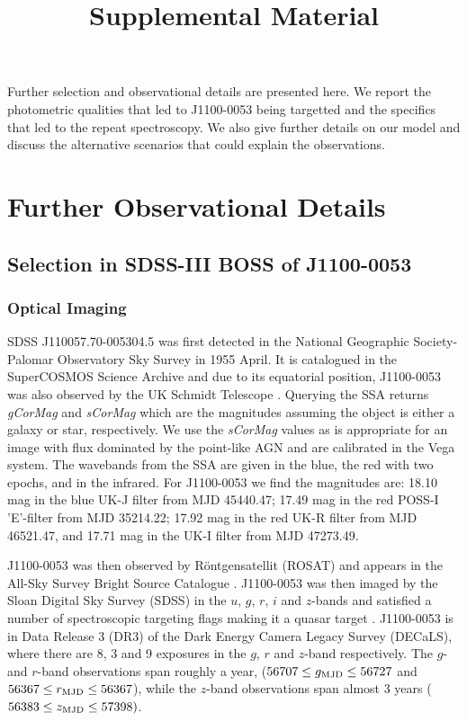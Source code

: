 \documentclass[11pt,a4paper]{article}
\begin{document}
   \title{Supplemental Material}
\maketitle

Further selection and observational details are presented here. We
report the photometric qualities that led to J1100-0053 being
targetted and the specifics that led to the repeat spectroscopy. We
also give further details on our model and discuss the alternative
scenarios that could explain the observations.


\section{Further Observational Details}

\subsection{Selection in SDSS-III BOSS of J1100-0053}

\subsubsection{Optical Imaging}
SDSS J110057.70-005304.5 was first detected in the National Geographic
Society-Palomar Observatory Sky Survey \cite[NGS-POSS; ][]{Abell1959,
Minkowski_Abell1963book} in 1955 April. It is catalogued in the
SuperCOSMOS Science Archive \cite[\href{http://ssa.roe.ac.uk/}{SSA};
][]{Hambly2001_I, Hambly2001_II} and due to its equatorial position,
J1100-0053 was also observed by the UK Schmidt Telescope \cite[UKST;
][]{Cannon1975, Cannon1979book}. Querying the SSA returns {\it
gCorMag} and {\it sCorMag} which are the magnitudes assuming the
object is either a galaxy or star, respectively. We use the {\it
sCorMag} values as is appropriate for an image with flux dominated by
the point-like AGN and are calibrated in the Vega system. The
wavebands from the SSA are given in the blue, the red with two epochs,
and in the infrared. For J1100-0053 we find the magnitudes are: 18.10
mag in the blue UK-J filter from MJD 45440.47; 17.49 mag in the red
POSS-I 'E'-filter from MJD 35214.22; 17.92 mag in the red UK-R filter
from MJD 46521.47, and 17.71 mag in the UK-I filter from MJD 47273.49.

J1100-0053 was then observed by R\"{o}ntgensatellit (ROSAT) and
appears in the All-Sky Survey Bright Source Catalogue \citep[RASS-BSC;
][]{Appenzeller1998, Voges1999}.  J1100-0053 was then imaged by the
Sloan Digital Sky Survey (SDSS) in the $u$, $g$, $r$, $i$ and
$z$-bands and satisfied a number of spectroscopic targeting flags
making it a quasar target \citep{Richards2002}.  J1100-0053 is in Data
Release 3 (DR3) of the Dark Energy Camera Legacy Survey (DECaLS),
where there are 8, 3 and 9 exposures in the $g$, $r$ and $z$-band
respectively. The $g$- and $r$-band observations span roughly a year,
($56707 \leq g_{\rm MJD} \leq 56727$ and $56367 \leq r_{\rm MJD} \leq
56367$), while the $z$-band observations span almost 3 years ($56383
\leq z_{\rm MJD} \leq 57398)$.
\end{document}
